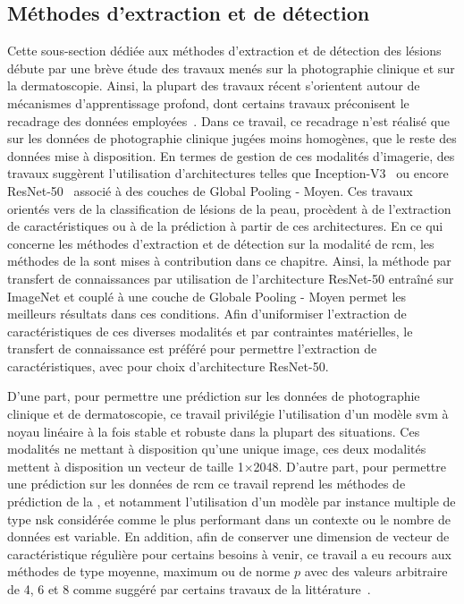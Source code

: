 \subsection{Méthodes d'extraction et de détection}
Cette sous-section dédiée aux méthodes d'extraction et de détection des lésions débute par une brève étude des travaux menés sur la photographie clinique et sur la dermatoscopie. Ainsi, la plupart des travaux récent s'orientent autour de mécanismes d'apprentissage profond, dont certains travaux préconisent le recadrage des données employées~\cite{Li2018}. Dans ce travail, ce recadrage n'est réalisé que sur les données de photographie clinique jugées moins homogènes, que le reste des données mise à disposition. En termes de gestion de ces modalités d'imagerie, des travaux suggèrent l'utilisation d'architectures telles que Inception-V3~\cite{Esteva2017,Fan2020} ou encore ResNet-50~\cite{Xie2018, Alantari2018} associé à des couches de Global Pooling - Moyen. Ces travaux orientés vers de la classification de lésions de la peau, procèdent à de l'extraction de caractéristiques ou à de la prédiction à partir de ces architectures. En ce qui concerne les méthodes d'extraction et de détection sur la modalité de \gls{rcm}, les méthodes de la  sont mises à contribution dans ce chapitre. Ainsi, la méthode par transfert de connaissances par utilisation de l'architecture ResNet-50 entraîné sur ImageNet et couplé à une couche de Globale Pooling - Moyen permet les meilleurs résultats dans ces conditions. Afin d'uniformiser l'extraction de caractéristiques de ces diverses modalités et par contraintes matérielles, le transfert de connaissance est préféré pour permettre l'extraction de caractéristiques, avec pour choix d'architecture ResNet-50.\par

D'une part, pour permettre une prédiction sur les données de photographie clinique et de dermatoscopie, ce travail privilégie l'utilisation d'un modèle \gls{svm} à noyau linéaire à la fois stable et robuste dans la plupart des situations. Ces modalités ne mettant à disposition qu’une unique image, ces deux modalités mettent à disposition un vecteur de taille 1$\times$2048. D'autre part, pour permettre une prédiction sur les données de \gls{rcm} ce travail reprend les méthodes de prédiction de la , et notamment l'utilisation d'un modèle par instance multiple de type \gls{nsk} considérée comme le plus performant dans un contexte ou le nombre de données est variable. En addition, afin de conserver une dimension de vecteur de caractéristique régulière pour certains besoins à venir, ce travail a eu recours aux méthodes de type moyenne, maximum ou de norme $p$ avec des valeurs arbitraire de 4, 6 et 8 comme suggéré par certains travaux de la littérature~\cite{Li2016,Xu2017}.\par

